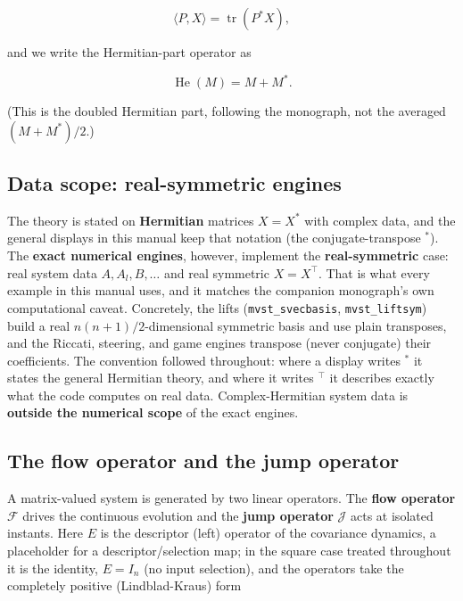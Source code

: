 \documentclass[11pt,oneside]{report}
\newcommand{\code}[1]{\texttt{#1}}
\begin{document}
\[\langle P,X\rangle=\operatorname{tr}(P^{*}X),\]

and we write the Hermitian-part operator as

\[\operatorname{He}(M)=M+M^{*}.\]

(This is the doubled Hermitian part, following the monograph, not the averaged
\((M+M^{*})/2\).)

\hypertarget{data-scope-real-symmetric-engines}{%
\subsection{Data scope: real-symmetric engines}\label{data-scope-real-symmetric-engines}}

The theory is stated on \textbf{Hermitian} matrices \(X = X^{*}\) with complex data, and
the general displays in this manual keep that notation (the conjugate-transpose
\({}^{*}\)). The \textbf{exact numerical engines}, however, implement the
\textbf{real-symmetric} case: real system data \(A, A_l, B, \dots\) and real symmetric
\(X = X^{\top}\). That is what every example in this manual uses, and it matches the
companion monograph's own computational caveat. Concretely, the lifts
(\code{mvst\_svecbasis}, \code{mvst\_liftsym}) build a real \(n(n+1)/2\)-dimensional symmetric
basis and use plain transposes, and the Riccati, steering, and game engines
transpose (never conjugate) their coefficients. The convention followed
throughout: where a display writes \({}^{*}\) it states the general Hermitian
theory, and where it writes \({}^{\top}\) it describes exactly what the code
computes on real data. Complex-Hermitian system data is \textbf{outside the numerical
scope} of the exact engines.

\hypertarget{the-flow-operator-and-the-jump-operator}{%
\subsection{The flow operator and the jump operator}\label{the-flow-operator-and-the-jump-operator}}

A matrix-valued system is generated by two linear operators. The \textbf{flow
operator} \(\mathcal{F}\) drives the continuous evolution and the \textbf{jump
operator} \(\mathcal{J}\) acts at isolated instants. Here \(E\) is the descriptor
(left) operator of the covariance dynamics, a placeholder for a
descriptor/selection map; in the square case treated throughout it is the
identity, \(E = I_n\) (no input selection), and the operators take the completely
positive (Lindblad-Kraus) form
\end{document}
